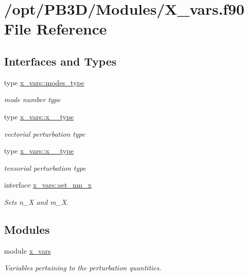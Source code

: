 \hypertarget{X__vars_8f90}{}\section{/opt/\+P\+B3\+D/\+Modules/\+X\+\_\+vars.f90 File Reference}
\label{X__vars_8f90}
\subsection*{Interfaces and Types}
\begin{DoxyCompactItemize}
\item 
type \hyperlink{structx__vars_1_1modes__type}{x\+\_\+vars\+::modes\+\_\+type}
\begin{DoxyCompactList}\small\item\em mode number type \end{DoxyCompactList}\item 
type \hyperlink{structx__vars_1_1x__1__type}{x\+\_\+vars\+::x\+\_\+\_\+type}
\begin{DoxyCompactList}\small\item\em vectorial perturbation type \end{DoxyCompactList}\item 
type \hyperlink{structx__vars_1_1x__2__type}{x\+\_\+vars\+::x\+\_\+\_\+type}
\begin{DoxyCompactList}\small\item\em tensorial perturbation type \end{DoxyCompactList}\item 
interface \hyperlink{interfacex__vars_1_1set__nm__x}{x\+\_\+vars\+::set\+\_\+nm\+\_\+x}
\begin{DoxyCompactList}\small\item\em Sets {\ttfamily n\+\_\+X} and {\ttfamily m\+\_\+X}. \end{DoxyCompactList}\end{DoxyCompactItemize}
\subsection*{Modules}
\begin{DoxyCompactItemize}
\item 
module \hyperlink{namespacex__vars}{x\+\_\+vars}
\begin{DoxyCompactList}\small\item\em Variables pertaining to the perturbation quantities. \end{DoxyCompactList}\end{DoxyCompactItemize}
